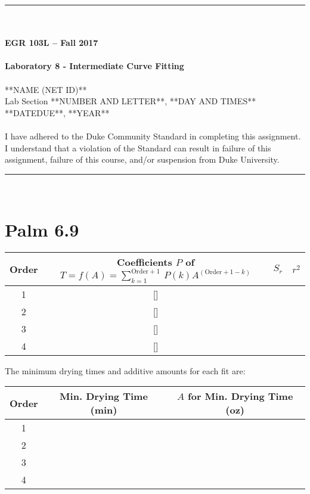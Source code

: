 \documentclass{article}
\begin{document}
\begin{center}
\rule{6.5in}{0.5mm}\\~\\
\textbf{\large EGR 103L -- Fall 2017}\\~\\
\textbf{\huge Laboratory 8 - Intermediate Curve Fitting}\\~\\
**NAME (NET ID)**\\
Lab Section **NUMBER AND LETTER**, **DAY AND TIMES**\\
**DATEDUE**, **YEAR**\\~\\
{\small I have adhered to the Duke Community Standard in completing
  this assignment.  I understand that a violation of the Standard can
  result in failure of this assignment, failure of this course, and/or
  suspension from Duke University.} 
\rule{6.5in}{0.5mm}\\
\end{center}
\tableofcontents
\listoffigures
\renewcommand{\arraystretch}{1.5}
\clearpage

\section{Palm 6.9}
\begin{center}
\begin{tabular}{|c|c|c|c|} \hline
Order & Coefficients $P$ of $T=f(A)=\sum_{k=1}^{\mbox{Order}+1}~P(k)A^{(\mbox{Order}+1-k)}$  & $S_r$ & $r^2$ \\ \hline
1 & [] & ~ & ~\\ \hline
2 & [] & ~ & ~ \\ \hline
3 & [] & ~ & ~ \\ \hline
4 & [] & ~ & ~ \\ \hline
\end{tabular}
\end{center}
The minimum drying times and additive amounts for each fit are:
\begin{center}
\begin{tabular}{|c|c|c|} \hline
  Order & Min. Drying Time (min) & $A$ for Min. Drying
Time (oz) \\ \hline
1 & ~ & ~ \\ \hline
2 & ~ & ~ \\ \hline
3 & ~ & ~ \\ \hline
4 & ~ & ~ \\ \hline
\end{tabular}
\end{center}
\end{document}
